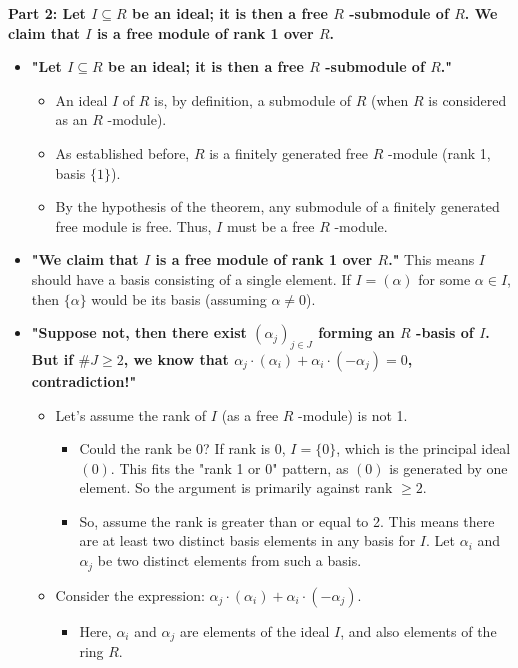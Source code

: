 \textbf{Part 2: Let $I \subseteq R$ be an ideal; it is then a free $R$ -submodule of $R$. We claim that $I$ is a free module of rank 1 over $R$.}

\begin{itemize}
	\item \textbf{"Let $I \subseteq R$ be an ideal; it is then a free $R$ -submodule of $R$."}
	\begin{itemize}
		\item An ideal $I$ of $R$ is, by definition, a submodule of $R$ (when $R$ is considered as an $R$ -module).
		\item As established before, $R$ is a finitely generated free $R$ -module (rank 1, basis $\{1\}$).
		\item By the hypothesis of the theorem, any submodule of a finitely generated free module is free. Thus, $I$ must be a free $R$ -module.
	\end{itemize}
	\item \textbf{"We claim that $I$ is a free module of rank 1 over $R$."}
This means $I$ should have a basis consisting of a single element. If $I = (\alpha)$ for some $\alpha \in I$, then $\{\alpha\}$ would be its basis (assuming $\alpha \neq 0$).
	\item \textbf{"Suppose not, then there exist $\left(\alpha_j\right)_{j \in J}$ forming an $R$ -basis of $I$. But if $\# J \geq 2$, we know that $\alpha_j \cdot\left(\alpha_i\right)+\alpha_i \cdot\left(-\alpha_j\right)=0$, contradiction!"}
	\begin{itemize}
		\item Let's assume the rank of $I$ (as a free $R$ -module) is not 1.
		\begin{itemize}
			\item Could the rank be 0? If rank is 0, $I = \{0\}$, which is the principal ideal $(0)$. This fits the "rank 1 or 0" pattern, as $(0)$ is generated by one element. So the argument is primarily against rank $\ge 2$.
			\item So, assume the rank is greater than or equal to 2. This means there are at least two distinct basis elements in any basis for $I$. Let $\alpha_i$ and $\alpha_j$ be two distinct elements from such a basis.
		\end{itemize}
		\item Consider the expression: $\alpha_j \cdot (\alpha_i) + \alpha_i \cdot (-\alpha_j)$.
		\begin{itemize}
			\item Here, $\alpha_i$ and $\alpha_j$ are elements of the ideal $I$, and also elements of the ring $R$.

\end{itemize}
\end{itemize}
\end{itemize}
